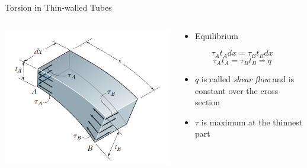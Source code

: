 \documentclass[10pt, svgnames]{beamer}
\begin{document}
\begin{frame}[label={sec:org15b6f41}]{Torsion in Thin-walled Tubes}
\begin{columns}
\begin{column}{0.5\columnwidth}
\begin{center}
\begin{center}
\includegraphics[width=.9\linewidth]{./pictures/thin-walled-tube.png}
\end{center}
\end{center}
\end{column}

\begin{column}{0.5\columnwidth}
\begin{itemize}
\item Equilibrium
\end{itemize}

\[\tau_A t_A dx = \tau_B t_B dx\] \[\tau_A t_A = \tau_B t_B = q\]

\begin{itemize}
\item \(q\) is called \emph{shear flow} and is constant over the cross section

\item \(\tau\) is maximum at the thinnest part
\end{itemize}
\end{column}
\end{columns}
\end{frame}
\end{document}
